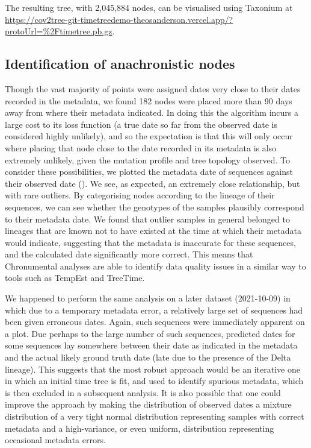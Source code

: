 The resulting tree, with 2,045,884 nodes, can be visualised using Taxonium at \url{https://cov2tree-git-timetreedemo-theosanderson.vercel.app/?protoUrl=\%2Ftimetree.pb.gz}.


\subsection*{Identification of anachronistic nodes}

Though the vast majority of points were assigned dates very close to their dates recorded in the metadata, we found 182 nodes were placed more than 90 days away from where their metadata indicated. In doing this the algorithm incurs a large cost to its loss function (a true date so far from the observed date is considered highly unlikely), and so the expectation is that this will only occur where placing that node close to the date recorded in its metadata is also extremely unlikely, given the mutation profile and tree topology observed. To consider these possibilities, we plotted the metadata date of sequences against their observed date (). We see, as expected, an extremely close relationship, but with rare outliers. By categorising nodes according to the lineage of their sequences, we can see whether the genotypes of the samples plausibly correspond to their metadata date. We found that outlier samples in general belonged to lineages that are known not to have existed at the time at which their metadata would indicate, suggesting that the metadata is inaccurate for these sequences, and the calculated date significantly more correct. This means that Chronumental analyses are able to identify data quality issues in a similar way to tools such as TempEst \citep{tempest} and TreeTime.

We happened to perform the same analysis on a later dataset (2021-10-09) in which due to a temporary metadata error, a relatively large set of sequences had been given erroneous dates. Again, such sequences were immediately apparent on a plot. Due perhaps to the large number of such sequences, predicted dates for some sequences lay somewhere between their date as indicated in the metadata and the actual likely ground truth date (late due to the presence of the Delta lineage). This suggests that the most robust approach would be an iterative one in which an initial time tree is fit, and used to identify  spurious metadata, which is then excluded in a subsequent analysis. It is also possible that one could improve the approach by making the distribution of observed dates a mixture distribution of a very tight normal distribution representing samples with correct metadata and a high-variance, or even uniform, distribution representing occasional metadata errors.

